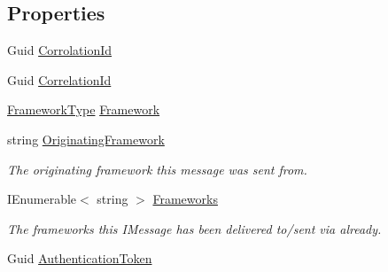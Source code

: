 \subsection*{Properties}
\begin{DoxyCompactItemize}
\item 
Guid \hyperlink{classCqrs_1_1Akka_1_1Tests_1_1Unit_1_1Events_1_1ConversationEnded_ad80a1eaaca1e0bdbe1192c364623f851_ad80a1eaaca1e0bdbe1192c364623f851}{Corrolation\+Id}
\item 
Guid \hyperlink{classCqrs_1_1Akka_1_1Tests_1_1Unit_1_1Events_1_1ConversationEnded_a99ad268bb52a4214a4b717bb8ecea6b6_a99ad268bb52a4214a4b717bb8ecea6b6}{Correlation\+Id}
\item 
\hyperlink{namespaceCqrs_1_1Messages_af06a7e6cd2609043d0f2f5f3419f81e3_af06a7e6cd2609043d0f2f5f3419f81e3}{Framework\+Type} \hyperlink{classCqrs_1_1Akka_1_1Tests_1_1Unit_1_1Events_1_1ConversationEnded_a9715459d0659db95b9471c50f5d280b8_a9715459d0659db95b9471c50f5d280b8}{Framework}
\item 
string \hyperlink{classCqrs_1_1Akka_1_1Tests_1_1Unit_1_1Events_1_1ConversationEnded_a84f8392985be189ed8394d308c76692f_a84f8392985be189ed8394d308c76692f}{Originating\+Framework}
\begin{DoxyCompactList}\small\item\em The originating framework this message was sent from. \end{DoxyCompactList}\item 
I\+Enumerable$<$ string $>$ \hyperlink{classCqrs_1_1Akka_1_1Tests_1_1Unit_1_1Events_1_1ConversationEnded_a1a8b4fd91323c4c9140051dff5f2bff6_a1a8b4fd91323c4c9140051dff5f2bff6}{Frameworks}
\begin{DoxyCompactList}\small\item\em The frameworks this I\+Message has been delivered to/sent via already. \end{DoxyCompactList}\item 
Guid \hyperlink{classCqrs_1_1Akka_1_1Tests_1_1Unit_1_1Events_1_1ConversationEnded_a025b7df73452f8e22337eabc4d11fab9_a025b7df73452f8e22337eabc4d11fab9}{Authentication\+Token}

\end{DoxyCompactItemize}
